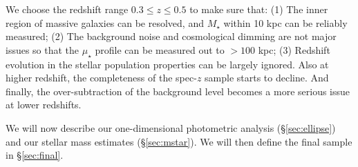 \documentclass[a4paper,fleqn,usenatbib]{mnras}
\def\msun{$M_\odot$}
\def\mstar{{$M_{\star}$}}
\def\logms{{$\log (M_{\star}/M_{\odot})$}}
\def\mden{{$\mu_{\star}$}}
\begin{document}
    We choose the redshift range $0.3 \leq z \leq 0.5$ to make sure that: 
    (1) The inner region of massive galaxies can be resolved, and \mstar{} within 
    10 kpc can be reliably measured; 
    (2) The background noise and cosmological dimming are not major issues so that the 
    \mden{} profile can be measured out to $>100$ kpc; 
    (3) Redshift evolution in the stellar population properties can be largely 
    ignored.  
    Also at higher redshift, the completeness of the spec-$z$ sample starts to decline. 
    And finally, the over-subtraction of the background level becomes a more serious 
    issue at lower redshifts.  
   
    We will now describe our one-dimensional photometric analysis 
    (\S \ref{sec:ellipse}) and our stellar mass estimates (\S \ref{sec:mstar}). 
    We will then define the final sample in \S \ref{sec:final}.
    
\end{document}
